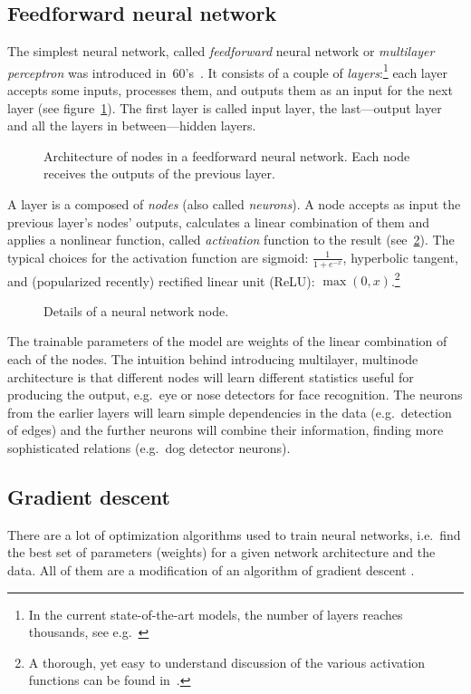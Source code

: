 \subsection{Feedforward neural network}
The simplest neural network, called \emph{feedforward} neural network or \emph{multilayer perceptron} was introduced in~60's~\cite{mlp}.
It consists of a couple of \emph{layers}:\footnote{In the current state-of-the-art models, the number of layers reaches thousands, see e.g.~\cite{stochastic}} each layer accepts some inputs, processes them, and outputs them as an input for the next layer (see figure~\ref{ann-layers}). The first layer is called input layer, the last---output layer and all the layers in between---hidden layers.
\begin{figure}[h]
  \centering
  \resizebox{0.6\textwidth}{!}{
  
  }
  \caption{Architecture of nodes in a feedforward neural network. Each node receives the outputs of the previous layer.}\label{ann-layers} 
\end{figure}

A layer is a composed of \emph{nodes} (also called \emph{neurons}). A node accepts as input the previous layer's nodes' outputs, calculates a linear combination of them and applies a nonlinear function, called \emph{activation} function to the result (see~\ref{ann-nodes}). The typical choices for the activation function are sigmoid: $\frac{1}{1 + e^{-x}}$, hyperbolic tangent, and (popularized recently) rectified linear unit (ReLU): $\max(0, x)$.\footnote{A thorough, yet easy to understand discussion of the various activation functions can be found in~\cite{cs231-actfun}.}
\begin{figure}[h]
  \centering
  \resizebox{0.7\textwidth}{!}{
  
}
  \caption{Details of a neural network node.} \label{ann-nodes}
\end{figure}

The trainable parameters of the model are weights of the linear combination of each of the nodes. The intuition behind introducing multilayer, multinode architecture is that different nodes will learn different statistics useful for producing the output, e.g.~eye or nose detectors for face recognition. The neurons from the earlier layers will learn simple dependencies in the data (e.g.~detection of edges) and the further neurons will combine their information, finding more sophisticated relations (e.g.~dog detector neurons).

\subsection{Gradient descent}\label{gradient descent}
There are a lot of optimization algorithms used to train neural networks, i.e.~find the best set of parameters (weights) for a given network architecture and the data. All of them are a modification of an algorithm of gradient descent \cite{gradient-descent}.

